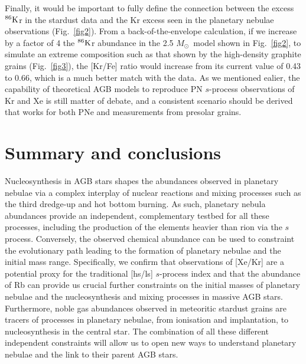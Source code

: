 \documentclass{iau}
\newcommand{\iso}[2]{\hbox{${}^{#1}{\rm #2}$}}
\newcommand{\msun}{\ensuremath{{M}_{\odot}}}
\begin{document}
Finally, it would be important to fully define the connection between the excess \iso{86}Kr in the 
stardust data and the Kr excess seen in the planetary nebulae observations 
(Fig.~\ref{fig2}). From a back-of-the-envelope calculation, if we increase by a factor 
of 4 the \iso{86}Kr abundance in the 2.5 \msun\ model shown in Fig.~\ref{fig2}, to 
simulate an extreme 
composition such as that shown by the high-density graphite grains (Fig.~\ref{fig3}), 
the [Kr/Fe] ratio
would increase from its current value of 0.43 to 0.66, 
which is a much better match with the 
data. 
As we mentioned ealier, the capability of theoretical AGB models to reproduce 
PN $s$-process observations of Kr and Xe is still matter of debate, and a consistent scenario should be derived that works for both PNe and measurements from presolar grains. 

\section{Summary and conclusions} 

Nucleosynthesis in AGB stars shapes the abundances observed in planetary nebulae via 
a complex interplay of nuclear reactions and mixing processes 
such as the third dredge-up and hot bottom burning. 
As such, planetary nebula abundances provide %
an independent, complementary testbed for all these processes, including the production of the elements heavier than rion via the $s$ process. 
Conversely, the observed chemical abundance can be used to constraint 
the evolutionary path leading to the formation of planetary nebulae and the 
initial mass range.   
Specifically, we confirm that observations of [Xe/Kr] 
are a potential proxy for the traditional [hs/ls] $s$-process index and that the abundance 
of Rb can provide us crucial further constraints on the initial masses of planetary 
nebulae and the nucleosynthesis and mixing processes in massive AGB stars. Furthermore, 
noble 
gas abundances observed in meteoritic stardust grains are tracers of processes in 
planetary nebulae, from ionisation and implantation, to nucleosynthesis in the central 
star. 
The combination of all these different independent constraints will allow us to 
open new ways to understand planetary nebulae and the link to their parent AGB stars.




\end{document}

